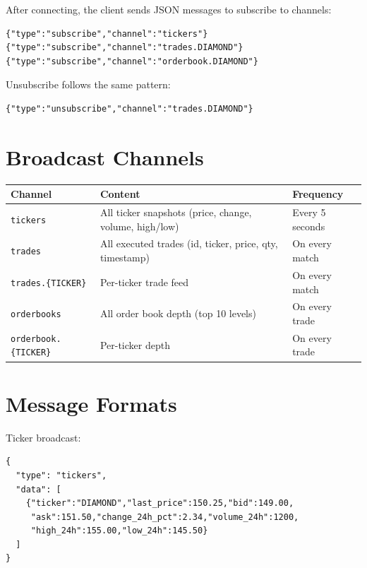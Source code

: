 \documentclass[12pt,a4paper]{report}
\begin{document}
After connecting, the client sends JSON messages to subscribe to channels:

\begin{lstlisting}[language=TeX, caption=Client subscribe message]
{"type":"subscribe","channel":"tickers"}
{"type":"subscribe","channel":"trades.DIAMOND"}
{"type":"subscribe","channel":"orderbook.DIAMOND"}
\end{lstlisting}

Unsubscribe follows the same pattern:

\begin{lstlisting}[language=TeX, caption=Client unsubscribe message]
{"type":"unsubscribe","channel":"trades.DIAMOND"}
\end{lstlisting}

\section{Broadcast Channels}

\begin{longtable}{>{\raggedright\arraybackslash}p{3.5cm}>{\raggedright\arraybackslash}p{7cm}>{\raggedright\arraybackslash}p{4cm}}
\toprule
\textbf{Channel} & \textbf{Content} & \textbf{Frequency} \\
\midrule
\endhead
\texttt{tickers} & All ticker snapshots (price, change, volume, high/low) & Every 5 seconds \\
\texttt{trades} & All executed trades (id, ticker, price, qty, timestamp) & On every match \\
\texttt{trades.\{TICKER\}} & Per-ticker trade feed & On every match \\
\texttt{orderbooks} & All order book depth (top 10 levels) & On every trade \\
\texttt{orderbook.\{TICKER\}} & Per-ticker depth & On every trade \\
\bottomrule
\end{longtable}

\section{Message Formats}

Ticker broadcast:

\begin{lstlisting}[language=TeX, caption=WebSocket ticker message]
{
  "type": "tickers",
  "data": [
    {"ticker":"DIAMOND","last_price":150.25,"bid":149.00,
     "ask":151.50,"change_24h_pct":2.34,"volume_24h":1200,
     "high_24h":155.00,"low_24h":145.50}
  ]
}
\end{lstlisting}
\end{document}
